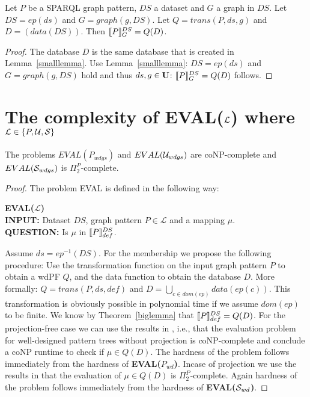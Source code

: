 \begin{theorem}\label{biglemma}
	Let $P$ be a SPARQL graph pattern, $DS$ a dataset and $G$ a graph in $DS$.
	Let $DS = ep(ds)$  and $G = graph(g,DS)$. Let $Q = trans(P,ds,g)$ and $D =
	(data(DS))$.	Then $\llbracket P \rrbracket^{DS}_G = Q(D)$.
\end{theorem}
\begin{proof}
	The database $D$ is the same database that is created in
	Lemma~\ref{smalllemma}.
	Use Lemma~\ref{smalllemma}: 
	$DS = ep(ds)$  and $G = graph(g,DS)$ hold and thus $ds,g \in \mathbf{U}$:
	$\llbracket P \rrbracket^{DS}_G = Q(D)$ follows.
\end{proof}

\section{The complexity of EVAL($\mathcal{L}$) where $\mathcal{L} \in \{P,\mathcal{U},\mathcal{S}\}$ }

\begin{corollary}
	The problems $EVAL(P_{wdgs})$ and $EVAL(\mathcal{U}_{wdgs})$ are coNP-complete and
	$EVAL(\mathcal{S}_{wdgs})$ is $\Pi^P_2$-complete.
\end{corollary}
\begin{proof}
The problem EVAL is defined in the following way:
\begin{framed}\noindent \textbf{EVAL($\mathcal{L}$)}\\
	\textbf{INPUT:} Dataset $DS$, graph pattern $P \in  \mathcal{L}$ and a mapping $\mu$.\\
	\textbf{QUESTION:} Is $\mu$ in $\llbracket P \rrbracket^{DS}_{def}$.
\end{framed}
Assume $ds = ep^{-1}(DS)$. %
For the membership we propose the following procedure:
Use the transformation function on the input graph pattern $P$ to obtain a wdPF
$Q$, and the data function to obtain the database $D$. More formally:
$Q = trans(P,ds,def)$ and $D = \bigcup\limits_{c\in dom(ep)} data(ep(c))$. This transformation is obviously
possible in polynomial time if we assume $dom(ep)$ to be finite. We know by Theorem~\ref{biglemma} that 
$\llbracket P \rrbracket^{DS}_{def} = Q(D)$.
For the projection-free case we can use the results in 
\cite{perez2009semantics}, i.e., that the evaluation problem for well-designed
pattern trees without projection is coNP-complete and conclude a coNP runtime to
check if $\mu \in Q(D)$.
The hardness of the problem follows immediately from the hardness of
\textbf{EVAL($P_{wd}$)}.
Incase of projection we use the results in \cite{letelier2013static}
that the evaluation of $\mu \in Q(D)$ is $\Pi^P_2$-complete.
Again hardness of the problem follows immediately from the hardness of 
\textbf{EVAL($\mathcal{S}_{wd}$)}.
\end{proof}


